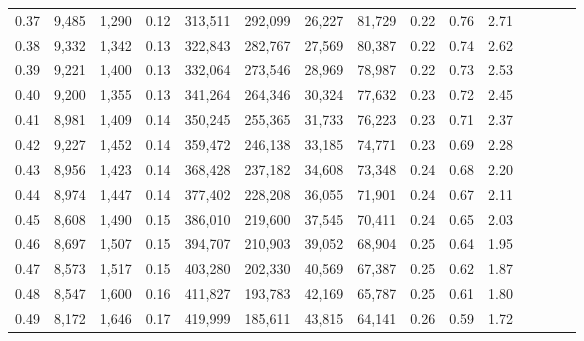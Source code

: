 \begin{tabular}{rrrcrrrrrrrrrrr}
0.37 &   9,485 &  1,290 &                                       0.12 &  313,511 &  292,099 &   26,227 &   81,729 &  0.22 &  0.76 &                         2.71 \\
0.38 &   9,332 &  1,342 &                                       0.13 &  322,843 &  282,767 &   27,569 &   80,387 &  0.22 &  0.74 &                         2.62 \\
0.39 &   9,221 &  1,400 &                                       0.13 &  332,064 &  273,546 &   28,969 &   78,987 &  0.22 &  0.73 &                         2.53 \\
0.40 &   9,200 &  1,355 &                                       0.13 &  341,264 &  264,346 &   30,324 &   77,632 &  0.23 &  0.72 &                         2.45 \\
0.41 &   8,981 &  1,409 &                                       0.14 &  350,245 &  255,365 &   31,733 &   76,223 &  0.23 &  0.71 &                         2.37 \\
0.42 &   9,227 &  1,452 &                                       0.14 &  359,472 &  246,138 &   33,185 &   74,771 &  0.23 &  0.69 &                         2.28 \\
0.43 &   8,956 &  1,423 &                                       0.14 &  368,428 &  237,182 &   34,608 &   73,348 &  0.24 &  0.68 &                         2.20 \\
0.44 &   8,974 &  1,447 &                                       0.14 &  377,402 &  228,208 &   36,055 &   71,901 &  0.24 &  0.67 &                         2.11 \\
0.45 &   8,608 &  1,490 &                                       0.15 &  386,010 &  219,600 &   37,545 &   70,411 &  0.24 &  0.65 &                         2.03 \\
0.46 &   8,697 &  1,507 &                                       0.15 &  394,707 &  210,903 &   39,052 &   68,904 &  0.25 &  0.64 &                         1.95 \\
0.47 &   8,573 &  1,517 &                                       0.15 &  403,280 &  202,330 &   40,569 &   67,387 &  0.25 &  0.62 &                         1.87 \\
0.48 &   8,547 &  1,600 &                                       0.16 &  411,827 &  193,783 &   42,169 &   65,787 &  0.25 &  0.61 &                         1.80 \\
0.49 &   8,172 &  1,646 &                                       0.17 &  419,999 &  185,611 &   43,815 &   64,141 &  0.26 &  0.59 &                         1.72 \\

\end{tabular}
